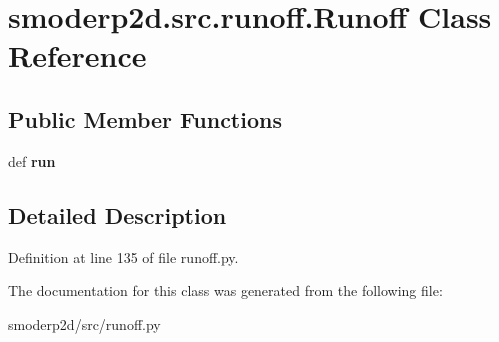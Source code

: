 \hypertarget{classsmoderp2d_1_1src_1_1runoff_1_1Runoff}{\section{smoderp2d.\-src.\-runoff.\-Runoff Class Reference}
\label{classsmoderp2d_1_1src_1_1runoff_1_1Runoff}
}
\subsection*{Public Member Functions}
\begin{DoxyCompactItemize}
\item 
\hypertarget{classsmoderp2d_1_1src_1_1runoff_1_1Runoff_a2c45be9fe5ed3087844b8712830865e4}{def {\bfseries run}}\label{classsmoderp2d_1_1src_1_1runoff_1_1Runoff_a2c45be9fe5ed3087844b8712830865e4}

\end{DoxyCompactItemize}


\subsection{Detailed Description}


Definition at line 135 of file runoff.\-py.



The documentation for this class was generated from the following file\-:\begin{DoxyCompactItemize}
\item 
smoderp2d/src/runoff.\-py\end{DoxyCompactItemize}
